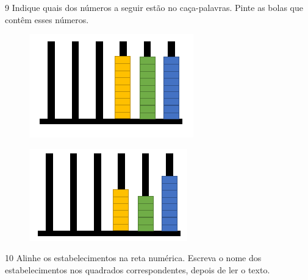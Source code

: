 
\pagebreak
\num{9} Indique quais dos números a seguir estão no caça-palavras. Pinte
as bolas que contêm esses números.

\begin{figure}[htpb!]
\includegraphics[width=\textwidth]{./media/image11.png}
\end{figure}

\begin{figure}[htpb!]
\includegraphics[width=\textwidth]{./media/image12.png}
\end{figure}


\pagebreak
\num{10} Alinhe os estabelecimentos na reta numérica. Escreva o nome dos
estabelecimentos nos quadrados correspondentes, depois de ler o texto.

